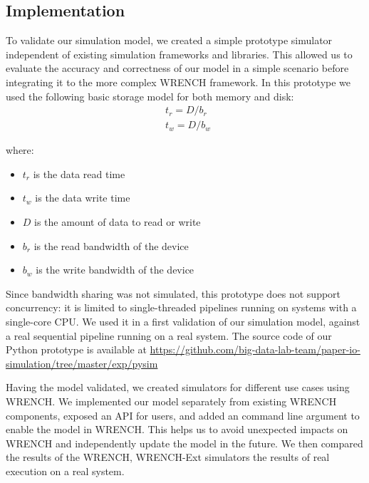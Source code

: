 \documentclass[conference]{IEEEtran}
\begin{document}
        \subsection{Implementation}

            To validate our simulation model, we created a simple prototype
            simulator independent of existing simulation frameworks and libraries. 
            This allowed us to evaluate the accuracy and correctness of our 
            model in a simple scenario before integrating it to the more complex 
            WRENCH framework. 
            In this prototype we used the following basic storage model for 
            both memory and disk: 
            \begin{align*}
                & t_{r} = D / b_r \\ 
                & t_{w} = D / b_w\
            \end{align*}        
            
            where:
            \begin{itemize}
                \item $t_{r}$ is the data read time
                \item $t_{w}$ is the data write time
                \item $D$ is the amount of data to read or write
                \item $b_r$ is the read bandwidth of the device
                \item $b_w$ is the write bandwidth of the device
            \end{itemize}            

            Since bandwidth sharing was not simulated, this prototype does not support 
            concurrency: it is limited to single-threaded pipelines running on systems 
            with a single-core CPU. We used it in a first validation of our simulation 
            model, against a real sequential pipeline running on a real system.
            The source code of our Python prototype is available at 
            \url{https://github.com/big-data-lab-team/paper-io-simulation/tree/master/exp/pysim}
            
            Having the model validated, we created simulators for different use cases 
            using WRENCH.
            We implemented our model separately from existing WRENCH components, 
            exposed an API for users, and added an command line argument to enable 
            the model in WRENCH. 
            This helps us to avoid unexpected impacts on WRENCH and 
            independently update the model in the future. 
            We then compared the results of the WRENCH, WRENCH-Ext simulators 
            the results of real execution on a real system. 
        
\end{document}

